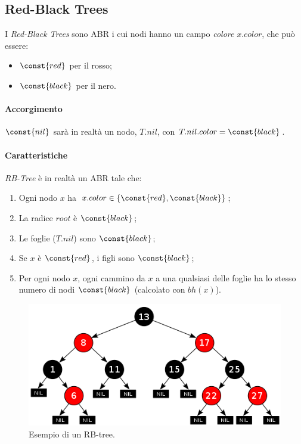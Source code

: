 \subsection{Red-Black Trees}

I \emph{Red-Black Trees} sono ABR i cui nodi hanno un campo \emph{colore} $x.color$, che può essere:
\begin{itemize}[noitemsep]
    \item $\const{red}$ per il rosso;
    \item $\const{black}$ per il nero.
\end{itemize}

\paragraph{Accorgimento} $\const{nil}$ sarà in realtà un nodo,
$T.nil$, con $T.nil.color = \const{black}$.

\paragraph{Caratteristiche} \emph{RB-Tree} è in realtà un ABR tale che:
\begin{enumerate}[label=($\arabic*$)]
    \item Ogni nodo $x$ ha $x.color \in \{\const{red},\const{black}\}$; \label{rbtree:1}
    \item La radice $root$ è $\const{black}$; \label{rbtree:2}
    \item Le foglie ($T.nil$) sono $\const{black}$; \label{rbtree:3}
    \item Se $x$ è $\const{red}$, i figli sono $\const{black}$; \label{rbtree:4}
    \item Per ogni nodo $x$, ogni cammino da $x$ a una qualsiasi delle foglie
    ha lo stesso numero di nodi $\const{black}$ (calcolato con $bh(x)$). \label{rbtree:5}
\end{enumerate} 

\begin{figure}[hbt]
    \centering
    \includegraphics[width=\textwidth]{img/rb-tree-ex.png}
    \caption{Esempio di un RB-tree.}
\end{figure}
\pagebreak

